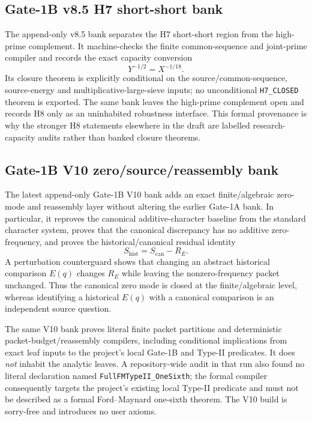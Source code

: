 \documentclass[11pt]{article}
\theoremstyle{definition}
\newcommand{\1}{\mathbf 1}
\begin{document}
\subsection{Gate-1B v8.5 H7 short-short bank}
The append-only v8.5 bank separates the H7 short-short region from the
high-prime complement.  It machine-checks the finite common-sequence and
joint-prime compiler and records the exact capacity conversion
\[
     Y^{-1/2}=X^{-1/18}.
\]
Its closure theorem is explicitly conditional on the source/common-sequence,
source-energy and multiplicative-large-sieve inputs; no unconditional
\texttt{H7\_CLOSED} theorem is exported.  The same bank leaves the high-prime
complement open and records H8 only as an uninhabited robustness interface.
This formal provenance is why the stronger H8 statements elsewhere in the
draft are labelled research-capacity audits rather than banked closure
theorems.

\subsection{Gate-1B V10 zero/source/reassembly bank}
The latest append-only Gate-1B V10 bank adds an exact finite/algebraic zero-mode
and reassembly layer without altering the earlier Gate-1A bank.  In particular,
it reproves the canonical additive-character baseline from the standard
character system, proves that the canonical discrepancy has no additive
zero-frequency, and proves the historical/canonical residual identity
\[
   S_{\mathrm{hist}}=S_{\mathrm{can}}-R_E.
\]
A perturbation counterguard shows that changing an abstract historical
comparison $E(q)$ changes $R_E$ while leaving the nonzero-frequency packet
unchanged.  Thus the canonical zero mode is closed at the finite/algebraic
level, whereas identifying a historical $E(q)$ with a canonical comparison is
an independent source question.

The same V10 bank proves literal finite packet partitions and deterministic
packet-budget/reassembly compilers, including conditional implications from
exact leaf inputs to the project's local Gate-1B and Type-II predicates.  It
does \emph{not} inhabit the analytic leaves.  A repository-wide audit in that
run also found no literal declaration named \texttt{FullFMTypeII}\allowbreak\texttt{\_OneSixth};
the formal compiler consequently targets the project's existing local Type-II
predicate and must not be described as a formal Ford--Maynard one-sixth theorem.
The V10 build is sorry-free and introduces no user axioms.
\end{document}
